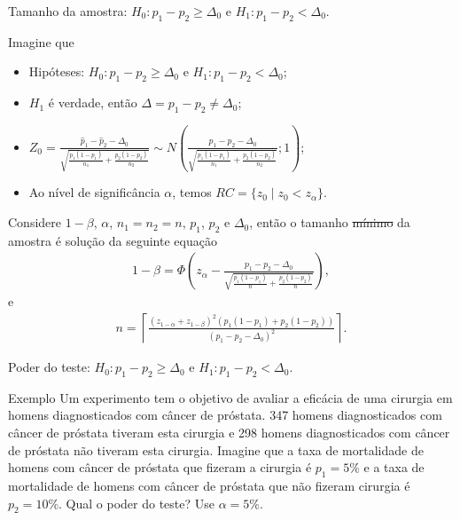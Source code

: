\documentclass[9pt]{beamer}
\begin{document}
\begin{frame}{Tamanho da amostra: $H_0:p_1 - p_2 \geq \Delta_0$ e $H_1: p_1 - p_2 < \Delta_0$.}

Imagine que
\begin{itemize}
\item Hipóteses: $H_0: p_1 - p_2 \geq \Delta_0$ e $H_1: p_1 -  p_2 < \Delta_0$;
\item $H_1$ é verdade, então $\Delta = p_1-p_2 \neq \Delta_0$;
\item $Z_0 = \frac{\hat{p}_1 - \hat{p}_2 - \Delta_0}{\sqrt{ 
		\frac{p_1(1-p_1)}{n_1} + \frac{p_2(1-p_2)}{n_2} }} \sim N\left( \frac{p_1 - p_2 - \Delta_0}{\sqrt{\frac{p_1(1-p_1)}{n_1} + \frac{p_2(1-p_2)}{n_2}}};1 \right)$;
\item Ao nível de significância $\alpha$, temos $RC = \{ z_0 \mid z_0 < z_{\alpha}  \}$.
\end{itemize}
\vfill

Considere $1-\beta$, $\alpha$, $n_1=n_2=n$, $p_1$, $p_2$ e $\Delta_0$, então o tamanho \sout{mínimo} da amostra é solução da seguinte equação
\begin{align*}
1-\beta = \Phi\left( z_{\alpha} - \frac{p_1-p_2 - \Delta_0}{\sqrt{\frac{p_1(1-p_1)}{n} + \frac{p_2(1-p_2)}{n}}} \right),
\end{align*}
e
\begin{align*}
n = \left\lceil \frac{\left( z_{1-\alpha} + z_{1-\beta} \right)^2 \left( p_1(1 - p_1) + p_2(1 - p_2) \right)}{\left(p_1 - p_2 - \Delta_0\right)^2} \right\rceil.
\end{align*}
\end{frame}

\begin{frame}{Poder do teste: $H_0:p_1 - p_2 \geq \Delta_0$ e $H_1: p_1 - p_2 < \Delta_0$.}
\begin{block}{Exemplo}
	Um experimento tem o objetivo de avaliar a eficácia de uma cirurgia em homens diagnosticados com câncer de próstata. 347 homens diagnosticados com câncer de próstata tiveram esta cirurgia  e 298 homens diagnosticados com câncer de próstata não tiveram esta cirurgia. Imagine que a taxa de mortalidade de homens com câncer de próstata que fizeram a cirurgia é $p_1=5\%$ e a taxa de mortalidade de homens com câncer de próstata que não fizeram cirurgia é $p_2=10\%$. Qual o poder do teste? Use $\alpha=5\%$.
\end{block}
\end{frame}
\end{document}
